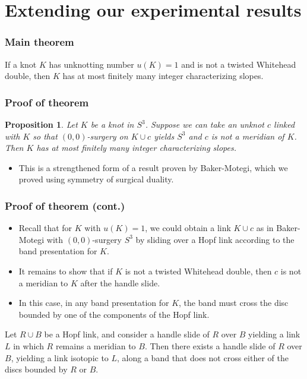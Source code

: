 \documentclass{beamer}
\newtheorem{proposition}[theorem]{Proposition}
\theoremstyle{ex}
\theoremstyle{rem}
\begin{document}
\section{Extending our experimental results}
	\begin{frame}
		\frametitle{Main theorem}
		\begin{theorem}
			If a knot $K$ has unknotting number $u(K)=1$ and is not a twisted Whitehead double, then $K$ has at most finitely many integer characterizing slopes.
		\end{theorem}
	\end{frame}

	\begin{frame}
		\frametitle{Proof of theorem}
		\begin{proposition}
			Let $K$ be a knot in $S^3$. Suppose we can take an unknot $c$ linked with $K$ so that $(0,0)$-surgery on $K\cup c$ yields $S^3$ and $c$ is not a meridian of $K$. Then $K$ has at most finitely many integer characterizing slopes.
		\end{proposition}
		\begin{itemize}
			\item This is a strengthened form of a result proven by Baker-Motegi, which we proved using symmetry of surgical duality.
		\end{itemize}
	\end{frame}


	\begin{frame}
		\frametitle{Proof of theorem (cont.)}
		\begin{itemize}
			\item Recall that  for $K$ with $u(K)=1$, we could obtain a link $K\cup c$ as in Baker-Motegi with $(0,0)$-surgery $S^3$ by sliding over a Hopf link according to the band presentation for $K$.
			
			\item It remains to show that if $K$ is not a twisted Whitehead double, then $c$ is not a meridian to $K$ after the handle slide.
			
			\item In this case, in any band presentation for $K$, the band must cross the disc bounded by one of the components of the Hopf link.
			
		\end{itemize}
	
		\begin{lemma}
			Let $R\cup B$ be a Hopf link, and consider a handle slide of $R$ over $B$ yielding a link $L$ in which $R$ remains a meridian to $B$. Then there exists a handle slide of $R$ over $B$, yielding a link isotopic to $L$, along a band that does not cross either of the discs bounded by $R$ or $B$.
		\end{lemma}
	\end{frame}
\end{document}
